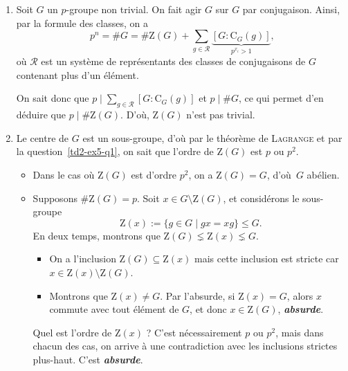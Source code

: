 \documentclass[./main]{subfiles}
\begin{document}
  \begin{enumerate}
    \item Soit $G$ un $p$-groupe non trivial. On fait agir $G$ sur $G$ par conjugaison.
      Ainsi, par la formule des classes, on a \[
        p^n = \# G = \#\mathrm{Z}(G) + \sum_{g \in \mathcal{R}} \underbrace{[G : \mathrm{C}_G(g)]}_{p^{x_i} > 1}
      ,\] où $\mathcal{R}$ est un système de représentants des classes de conjugaisons de $G$ contenant plus d'un élément.

      On sait donc que $p  \mid \sum_{g \in \mathcal{R}} [G : \mathrm{C}_G(g)]$ et $p  \mid \#G$, ce qui permet d'en déduire que $p  \mid \# \mathrm{Z}(G)$.
      D'où, $\mathrm{Z}(G)$ n'est pas trivial.
    \item Le centre de $G$ est un sous-groupe, d'où par le théorème de \textsc{Lagrange} et par la question~\ref{td2-ex5-q1}, on sait que l'ordre de $\mathrm{Z}(G)$ est $p$ ou $p^2$.
      \begin{itemize}
        \item Dans le cas où $\mathrm{Z}(G)$ est d'ordre $p^2$, on a $\mathrm{Z}(G) = G$, d'où~$G$ abélien.
        \item Supposons $\# \mathrm{Z}(G) = p$. Soit $x \in G \setminus \mathrm{Z}(G)$, et considérons le sous-groupe \[
            \mathrm{Z}(x) := \{g \in G  \mid g x = x g\} \le G
          .\]
          En deux temps, montrons que $\mathrm{Z}(G) \lneq \mathrm{Z}(x) \lneq G$.
          \begin{itemize}
            \item On a l'inclusion $\mathrm{Z}(G) \subseteq \mathrm{Z}(x)$ mais cette inclusion est stricte car $x \in \mathrm{Z}(x) \setminus \mathrm{Z}(G)$.
            \item Montrons que $\mathrm{Z}(x) \neq G$. Par l'absurde, si $\mathrm{Z}(x) = G$, alors $x$ commute avec tout élément de $G$, et donc $x \in \mathrm{Z}(G)$, \textit{\textbf{absurde}}.
          \end{itemize}
          Quel est l'ordre de $\mathrm{Z}(x)$ ? C'est nécessairement $p$ ou $p^2$, mais dans chacun des cas, on arrive à une contradiction avec les inclusions strictes plus-haut.
          C'est \textit{\textbf{absurde}}.
      \end{itemize}
  \end{enumerate}
\end{document}
